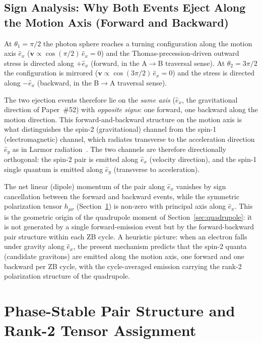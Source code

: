 \documentclass[%
 reprint, amsmath,amssymb, aps, prb, ]{revtex4-2}
\numberwithin{equation}{section}
\newcommand{\iphase}{\theta}
\newcommand{\ehat}[1]{\hat{e}_{#1}}
\begin{document}
\subsection{Sign Analysis: Why Both Events Eject Along the Motion Axis (Forward and Backward)}

At $\iphase_1 = \pi/2$ the photon sphere reaches a turning configuration along the motion axis $\ehat{x}$ ($\mathbf{v} \propto \cos(\pi/2)\,\ehat{x} = 0$) and the Thomas-precession-driven outward stress is directed along $+\ehat{x}$ (forward, in the A$\to$B traversal sense).
At $\iphase_2 = 3\pi/2$ the configuration is mirrored ($\mathbf{v} \propto \cos(3\pi/2)\,\ehat{x} = 0$) and the stress is directed along $-\ehat{x}$ (backward, in the B$\to$A traversal sense).

The two ejection events therefore lie on the \emph{same axis} ($\ehat{x}$, the gravitational direction of Paper~\#52) with \emph{opposite signs}: one forward, one backward along the motion direction.
This forward-and-backward structure on the motion axis is what distinguishes the spin-2 (gravitational) channel from the spin-1 (electromagnetic) channel, which radiates transverse to the acceleration direction $\ehat{y}$ as in Larmor radiation~\cite{Jackson1999}.
The two channels are therefore directionally orthogonal: the spin-2 pair is emitted along $\ehat{x}$ (velocity direction), and the spin-1 single quantum is emitted along $\ehat{y}$ (transverse to acceleration).

The net linear (dipole) momentum of the pair along $\ehat{x}$ vanishes by sign cancellation between the forward and backward events, while the symmetric polarization tensor $h_{\mu\nu}$ (Section~\ref{sec:rank2}) is non-zero with principal axis along $\ehat{x}$.
This is the geometric origin of the quadrupole moment of Section~\ref{sec:quadrupole}: it is not generated by a single forward-emission event but by the forward-backward pair structure within each ZB cycle.
A heuristic picture: when an electron falls under gravity along $\ehat{x}$, the present mechanism predicts that the spin-2 quanta (candidate gravitons) are emitted along the motion axis, one forward and one backward per ZB cycle, with the cycle-averaged emission carrying the rank-2 polarization structure of the quadrupole.


\section{Phase-Stable Pair Structure and Rank-2 Tensor Assignment}
\label{sec:rank2}
\end{document}
